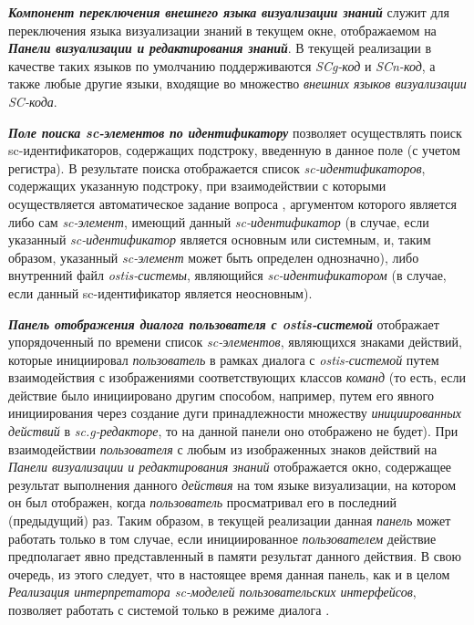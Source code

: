 \textbf{\textit{Компонент переключения внешнего языка визуализации знаний}} служит для переключения языка визуализации знаний в текущем окне, отображаемом на \textbf{\textit{Панели визуализации и редактирования знаний}}. В текущей реализации в качестве таких языков по умолчанию поддерживаются \textit{SCg-код} и \textit{SCn-код}, а также любые другие языки, входящие во множество \textit{внешних языков визуализации SC-кода}.

\textbf{\textit{Поле поиска sc-элементов по идентификатору}} позволяет осуществлять поиск \mbox{sc-идентификаторов}, содержащих подстроку, введенную в данное поле (с учетом регистра). В результате поиска отображается список \textit{sc-идентификаторов}, содержащих указанную подстроку, при взаимодействии с которыми осуществляется автоматическое задание вопроса , аргументом которого является либо сам \textit{sc-элемент}, имеющий данный \textit{sc-идентификатор} (в случае, если указанный \textit{sc-идентификатор} является основным или системным, и, таким образом, указанный \textit{sc-элемент} может быть определен однозначно), либо внутренний файл \textit{ostis-системы}, являющийся \textit{sc-идентификатором} (в случае, если данный sc-идентификатор является неосновным).

\textbf{\textit{Панель отображения диалога пользователя с ostis-системой}} отображает упорядоченный по времени список \textit{sc-элементов}, являющихся знаками действий, которые инициировал \textit{пользователь} в рамках диалога с \textit{ostis-системой} путем взаимодействия с изображениями соответствующих классов \textit{команд} (то есть, если действие было инициировано другим способом, например, путем его явного инициирования через создание дуги принадлежности множеству \textit{инициированных действий} в \textit{sc.g-редакторе}, то на данной панели оно отображено не будет). При взаимодействии \textit{пользователя} с любым из изображенных знаков действий на \textit{Панели визуализации и редактирования знаний} отображается окно, содержащее результат выполнения данного \textit{действия} на том языке визуализации, на котором он был отображен, когда \textit{пользователь} просматривал его в последний (предыдущий) раз. Таким образом, в текущей реализации данная \textit{панель} может работать только в том случае, если инициированное \textit{пользователем} действие предполагает явно представленный в памяти результат данного действия. В свою очередь, из этого следует, что в настоящее время данная панель, как и в целом \textit{Реализация интерпретатора sc-моделей пользовательских интерфейсов}, позволяет работать с системой только в режиме диалога .

